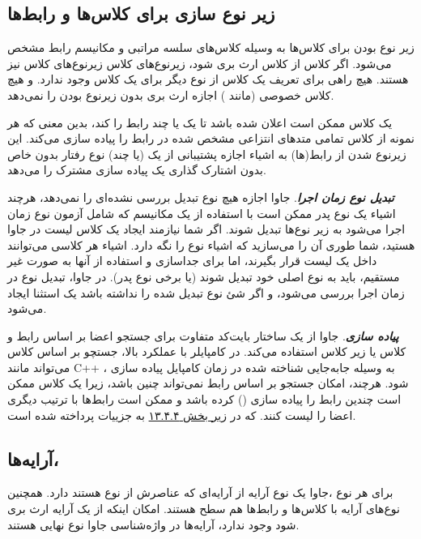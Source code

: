 \documentclass[a4paper,12pt]{report}
\newcommand{\lrm}[1]{{\color{steelBlue}\lr{\texttt{#1}}}}
\begin{document}
	\subsection{
	زیر نوع سازی برای کلاس‌ها و رابط‌ها}
	زیر نوع بودن برای کلاس‌ها به وسیله کلاس‌های سلسه مراتبی و مکانیسم رابط مشخص می‌شود.
	اگر کلاس
	\lrm{A}
	از کلاس 
	\lrm{B}
	ارث بری شود، زیر‌نوع‌های کلاس 
	\lrm{A}
	زیرنوع‌های کلاس
	\lrm{B}
	نیز هستند. هیچ راهی‌ برای تعریف یک کلاس از نوع دیگر برای یک کلاس وجود ندارد.
	و هیچ کلاس خصوصی (مانند 
	)
	اجازه ارث بری بدون زیرنوع بودن را نمی‌دهد. 
	
	یک کلاس ممکن است اعلان شده باشد تا یک یا چند رابط را 
	 \lrm{implement}
	کند، بدین معنی که هر نمونه از کلاس تمامی متد‌های انتزاعی مشخص شده در رابط را پیاده سازی می‌کند.
	این زیرنوع شدن از رابط‌(ها) به اشیاء اجازه پشتیبانی از یک (یا چند) نوع رفتار بدون خاص بدون اشتارک گذاری یک پیاده سازی مشترک را می‌دهد.
	
	
	\textbf{\textit{
	تبدیل نوع زمان اجرا}}. جاوا اجازه هیچ نوع تبدیل بررسی نشده‌ای را نمی‌دهد، هرچند اشیاء یک نوع پدر ممکن است با استفاده از یک مکانیسم که شامل آزمون نوع زمان اجرا می‌شود به زیر نوع‌ها  تبدیل شوند. اگر شما نیازمند ایجاد یک کلاس لیست در جاوا هستید، شما طوری آن را می‌سازید که اشیاء نوع  
	\lrm{Object}
	را نگه دارد. اشیاء هر کلاسی می‌توانند داخل یک لیست قرار بگیرند، اما برای جداسازی و استفاده از آنها به صورت غیر مستقیم، باید به نوع اصلی خود تبدیل شوند (یا برخی نوع پدر). 
	در جاوا، تبدیل نوع در زمان اجرا بررسی می‌شود، و اگر شئ نوع تبدیل شده را نداشته باشد یک استثنا ایجاد می‌شود.
	
	\textbf{\textit{
		پیاده سازی}}. جاوا از یک ساختار بایت‌کد متفاوت برای جستجو اعضا بر اساس رابط و کلاس یا زیر کلاس استفاده می‌کند. در کامپایلر با عملکرد بالا، جستچو بر اساس کلاس می‌تواند مانند 
	C++
	، به وسیله جابه‌جایی
	 شناخته شده در زمان کامپایل پیاده سازی شود. هرچند، امکان جستجو بر اساس رابط نمی‌تواند چنین باشد، زیرا یک کلاس ممکن است چندین رابط را پیاده سازی 
	()
	کرده باشد و ممکن است رابط‌ها با ترتیب دیگری اعضا را لیست کنند. که در 
	\hyperref[subsec4:sec4:chap13]{
	زیر بخش ۱۳.۴.۴} به جزییات پرداخته شده است.
	
	\subsection{
	آرایه‌ها، }
	برای هر نوع 
	\lrm{T}
	،جاوا یک نوع آرایه 
	\lrm{T[]}
	از آرایه‌ای که عناصرش از نوع 
	\lrm{T}
	هستند دارد. همچنین نوع‌های آرایه با کلاس‌ها و رابط‌ها هم سطح هستند. 
	امکان اینکه از یک آرایه ارث بری شود وجود ندارد، آرایه‌ها در واژه‌شناسی جاوا نوع نهایی هستند.
	
\end{document}
